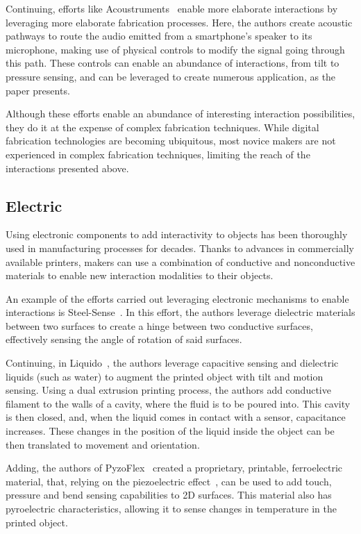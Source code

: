       Continuing, efforts like Acoustruments~\cite{Laput:2015hn} enable more
      elaborate interactions by leveraging more elaborate fabrication
      processes. Here, the authors create acoustic pathways to route the audio
      emitted from a smartphone's speaker to its microphone, making use of
      physical controls to modify the signal going through this path. These
      controls can enable an abundance of interactions, from tilt to pressure
      sensing, and can be leveraged to create numerous application, as the
      paper presents.

      Although these efforts enable an abundance of interesting interaction
      possibilities, they do it at the expense of complex fabrication
      techniques. While digital fabrication technologies are becoming
      ubiquitous, most novice makers are not experienced in complex fabrication
      techniques, limiting the reach of the interactions presented above.

    \subsection{Electric}
      Using electronic components to add interactivity to objects has been
      thoroughly used in manufacturing processes for decades. Thanks to advances
      in commercially available printers, makers can use a combination of
      conductive and nonconductive materials to enable new interaction
      modalities to their objects.

      An example of the efforts carried out leveraging electronic mechanisms to
      enable interactions is Steel-Sense~\cite{Vasilevitsky:2016hy}. In this
      effort, the authors leverage dielectric materials between two surfaces to
      create a hinge between two conductive surfaces, effectively sensing the
      angle of rotation of said surfaces.

      Continuing, in Liquido~\cite{Schmitz:2016cv}, the authors leverage capacitive
      sensing and dielectric liquids (such as water) to augment the printed
      object with tilt and motion sensing. Using a dual extrusion printing
      process, the authors add conductive filament to the walls of a cavity,
      where the fluid is to be poured into. This cavity is then closed, and,
      when the liquid comes in contact with a sensor, capacitance increases.
      These changes in the position of the liquid inside the object can be then
      translated to movement and orientation.

      Adding, the authors of PyzoFlex~\cite{Rendl:2012er} created a
      proprietary, printable, ferroelectric material, that, relying on the
      piezoelectric effect~\cite{Cady:1964fh}, can be used to add touch, pressure and
      bend sensing capabilities to 2D surfaces. This material also has
      pyroelectric characteristics, allowing it to sense changes in temperature
      in the printed object.

